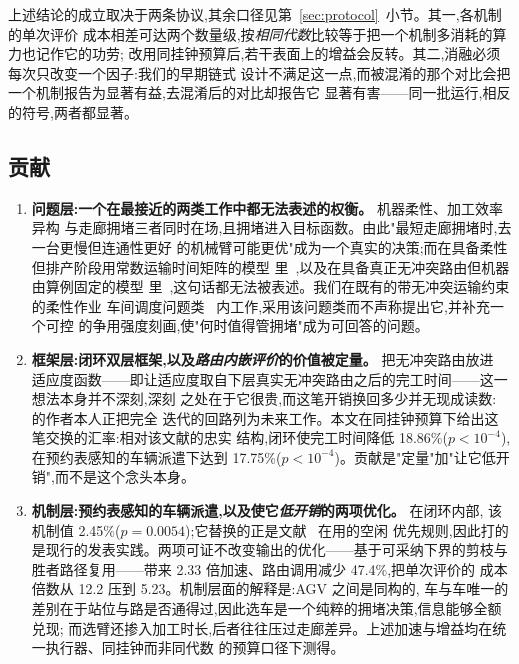 \documentclass[manuscript,screen,review]{acmart}
\newcommand{\GainLoopRule}{18.86\%}      %
\newcommand{\PLoopRule}{<10^{-4}}
\newcommand{\GainLoopProbe}{17.75\%}     %
\newcommand{\PLoopProbe}{<10^{-4}}
\newcommand{\GainProbeLoop}{2.45\%}      %
\newcommand{\PProbeLoop}{=0.0054}
\newcommand{\SpeedupProbe}{2.33}
\newcommand{\RouteCallCut}{47.4\%}
\newcommand{\CostMultBefore}{12.2}
\newcommand{\CostMultAfter}{5.23}
\begin{document}
上述结论的成立取决于两条协议,其余口径见第~\ref{sec:protocol}~小节。其一,各机制的单次评价
成本相差可达两个数量级,按\emph{相同代数}比较等于把一个机制多消耗的算力也记作它的功劳;
改用同挂钟预算后,若干表面上的增益会反转。其二,消融必须每次只改变一个因子:我们的早期链式
设计不满足这一点,而被混淆的那个对比会把一个机制报告为显著有益,去混淆后的对比却报告它
显著有害——同一批运行,相反的符号,两者都显著。

\subsection{贡献}

\begin{enumerate}[leftmargin=*]

\item \textbf{问题层:一个在最接近的两类工作中都无法表述的权衡。} 机器柔性、加工效率异构
与走廊拥堵三者同时在场,且拥堵进入目标函数。由此"最短走廊拥堵时,去一台更慢但连通性更好
的机械臂可能更优"成为一个真实的决策;而在具备柔性但排产阶段用常数运输时间矩阵的模型
里~\cite{sun2023integrated},以及在具备真正无冲突路由但机器由算例固定的模型
里~\cite{li2026framework},这句话都无法被表述。我们在既有的带无冲突运输约束的柔性作业
车间调度问题类~\cite{vanos2026exact} 内工作,采用该问题类而不声称提出它,并补充一个可控
的争用强度刻画,使"何时值得管拥堵"成为可回答的问题。

\item \textbf{框架层:闭环双层框架,以及\emph{路由内嵌评价}的价值被定量。} 把无冲突路由放进
适应度函数——即让适应度取自下层真实无冲突路由之后的完工时间——这一想法本身并不深刻,深刻
之处在于它很贵,而这笔开销换回多少并无现成读数:\cite{li2026framework} 的作者本人正把完全
迭代的回路列为未来工作。本文在同挂钟预算下给出这笔交换的汇率:相对该文献的忠实
结构,闭环使完工时间降低 \GainLoopRule{}($p\PLoopRule$),在预约表感知的车辆派遣下达到
\GainLoopProbe{}($p\PLoopProbe$)。贡献是"定量"加"让它低开销",而不是这个念头本身。

\item \textbf{机制层:预约表感知的车辆派遣,以及使它\emph{低开销}的两项优化。} 在闭环内部,
该机制值 \GainProbeLoop{}($p\PProbeLoop$);它替换的正是文献~\cite{li2026framework} 在用的空闲
优先规则,因此打的是现行的发表实践。两项可证不改变输出的优化——基于可采纳下界的剪枝与
胜者路径复用——带来 \SpeedupProbe{} 倍加速、路由调用减少 \RouteCallCut{},把单次评价的
成本倍数从 \CostMultBefore{} 压到 \CostMultAfter{}。机制层面的解释是:AGV 之间是同构的,
车与车唯一的差别在于站位与路是否通得过,因此选车是一个纯粹的拥堵决策,信息能够全额兑现;
而选臂还掺入加工时长,后者往往压过走廊差异。上述加速与增益均在统一执行器、同挂钟而非同代数
的预算口径下测得。


\end{enumerate}
\end{document}
